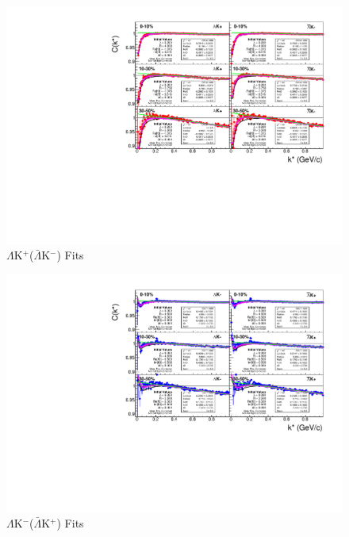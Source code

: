 \documentclass[../AnalysisNoteJBuxton.tex]{subfiles}
\begin{document}
\begin{figure}[h]
  \centering
  \includegraphics[width=\textwidth]{5_Fitting/Figures/canKStarCfwFitsLamKchPwConj_MomResCrctn_NonFlatBgdCrctn.pdf}
  \caption[$\Lambda$K$^{+}$($\bar{\Lambda}$K$^{-}$) Fits]{$\Lambda$K$^{+}$($\bar{\Lambda}$K$^{-}$) Fits}
  \label{fig:LamKchPwConjFits}
\end{figure}

\begin{figure}[h]
  \centering
  \includegraphics[width=\textwidth]{5_Fitting/Figures/canKStarCfwFitsLamKchMwConj_MomResCrctn_NonFlatBgdCrctn.pdf}
  \caption[$\Lambda$K$^{-}$($\bar{\Lambda}$K$^{+}$) Fits]{$\Lambda$K$^{-}$($\bar{\Lambda}$K$^{+}$) Fits}
  \label{fig:LamKchMwConjFits}
\end{figure}
\end{document}
